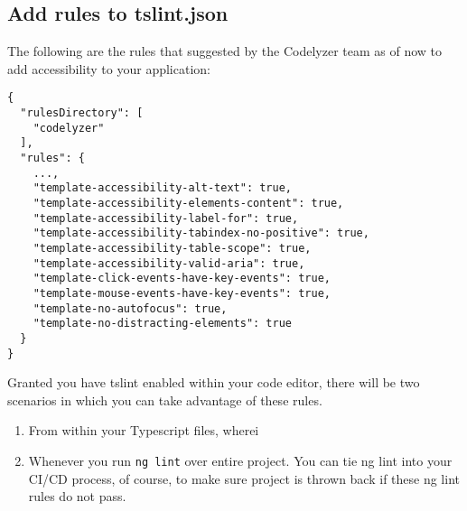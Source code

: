 \subsection{Add rules to tslint.json}
The following are the rules that suggested by the Codelyzer team as of now to add accessibility to your application: 
\begin{lstlisting}
{
  "rulesDirectory": [
    "codelyzer"
  ],
  "rules": {
    ...,
    "template-accessibility-alt-text": true,
    "template-accessibility-elements-content": true,
    "template-accessibility-label-for": true,
    "template-accessibility-tabindex-no-positive": true,
    "template-accessibility-table-scope": true,
    "template-accessibility-valid-aria": true,
    "template-click-events-have-key-events": true,
    "template-mouse-events-have-key-events": true,
    "template-no-autofocus": true,
    "template-no-distracting-elements": true
  }
}  
\end{lstlisting}

Granted you have tslint enabled within your code editor, there will be two scenarios in which you can take advantage of these rules. 
\begin{enumerate}
  \item From within your Typescript files, wherei
  \item Whenever you run \lstinline{ng lint} over entire project. You can tie ng lint into your CI/CD process, of course, to make sure project is thrown back if these ng lint rules do not pass. 
\end{enumerate}


